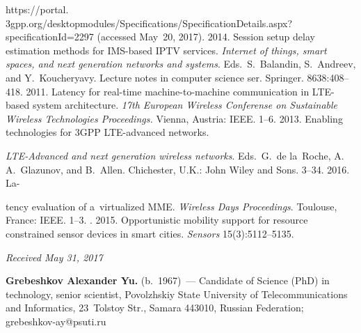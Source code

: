 \begin{multicols}{2}
{{\begin{thebibliography}{99}
{https://portal. 3gpp.org/desktopmodules/Specifications/Specification\linebreak Details.aspx?specificationId=2297}
 (accessed May~20, 2017).
 2014. Session setup delay estimation 
methods for IMS-based IPTV services. 
\textit{Internet of things, smart spaces, and next generation networks
and systems}.
Eds.\ S.~Balandin, S.~Andreev, and Y.~Koucheryavy.
{Lecture notes in computer science ser.} Springer.
8638:408--418.
 2011. Latency for real-time machine-to-machine 
communication in LTE-based system architecture. \textit{17th European Wireless 
Conferense on Sustainable Wireless Technologies Proceedings.} Vienna, Austria: 
IEEE. 1--6.
 2013. Enabling technologies 
for 3GPP LTE-advanced networks.\linebreak\vspace*{-11pt}

\pagebreak

\noindent
 \textit{LTE-Advanced and next generation 
wireless networks}. Eds.\
 G.~de la~Roche, A.\,A.~Glazunov, and B.~Allen.
Chichester, U.K.: John Wiley and Sons. 3--34.
 2016. La-\linebreak\vspace*{-11pt}

\columnbreak

\noindent
tency evaluation of 
a~virtualized MME. \textit{Wireless Days Proceedings}. Toulouse, 
France: IEEE. 1--3.
. 2015. 
Opportunistic mobility support for resource constrained sensor devices in smart 
cities. \textit{Sensors} 15(3):5112--5135.
{

}
\end{thebibliography}

 }
 }

\end{multicols}

\vspace*{-6pt}

\hfill{\small\textit{Received May 31, 2017}}


\Contr

\noindent
\textbf{Grebeshkov Alexander Yu.} (b.\ 1967)~--- Candidate of Science (PhD) in 
technology, senior scientist, Povolzhskiy State University of Telecommunications 
and Informatics, 23~Tolstoy Str., Samara 443010, Russian Federation;  
\mbox{grebeshkov-ay@psuti.ru}

